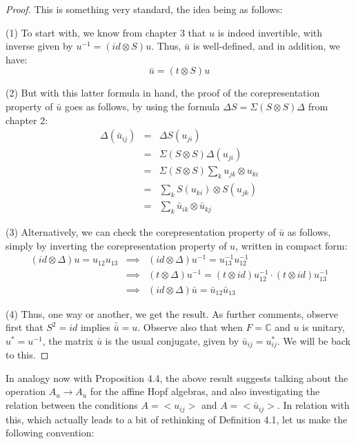 \documentclass[12pt]{amsbook}
\begin{document}
\begin{proof}
This is something very standard, the idea being as follows:

\medskip

(1) To start with, we know from chapter 3 that $u$ is indeed invertible, with inverse given by $u^{-1}=(id\otimes S)u$. Thus, $\bar{u}$ is well-defined, and in addition, we have:
$$\bar{u}=(t\otimes S)u$$

(2) But with this latter formula in hand, the proof of the corepresentation property of $\bar{u}$ goes as follows, by using the formula $\Delta S=\Sigma(S\otimes S)\Delta$ from chapter 2:
\begin{eqnarray*}
\Delta(\bar{u}_{ij})
&=&\Delta S(u_{ji})\\
&=&\Sigma(S\otimes S)\Delta(u_{ji})\\
&=&\Sigma(S\otimes S)\sum_ku_{jk}\otimes u_{ki}\\
&=&\sum_kS(u_{ki})\otimes S(u_{jk})\\
&=&\sum_k\bar{u}_{ik}\otimes\bar{u}_{kj}
\end{eqnarray*}

(3) Alternatively, we can check the corepresentation property of $\bar{u}$ as follows, simply by inverting the corepresentation property of $u$, written in compact form:
\begin{eqnarray*}
(id\otimes\Delta)u=u_{12}u_{13}
&\implies&(id\otimes\Delta)u^{-1}=u_{13}^{-1}u_{12}^{-1}\\
&\implies&(t\otimes\Delta)u^{-1}=(t\otimes id)u_{12}^{-1}\cdot(t\otimes id)u_{13}^{-1}\\
&\implies&(id\otimes\Delta)\bar{u}=\bar{u}_{12}\bar{u}_{13}
\end{eqnarray*}

(4) Thus, one way or another, we get the result. As further comments, observe first that $S^2=id$ implies $\bar{\bar{u}}=u$. Observe also that when $F=\mathbb C$ and $u$ is unitary, $u^*=u^{-1}$, the matrix $\bar{u}$ is the usual conjugate, given by $\bar{u}_{ij}=u_{ij}^*$. We will be back to this.
\end{proof}

In analogy now with Proposition 4.4, the above result suggests talking about the operation $A_u\to A_{\bar{u}}$ for the affine Hopf algebras, and also investigating the relation between the conditions $A=<u_{ij}>$ and $A=<\bar{u}_{ij}>$. In relation with this, which actually leads to a bit of rethinking of Definition 4.1, let us make the following convention:
\end{document}

